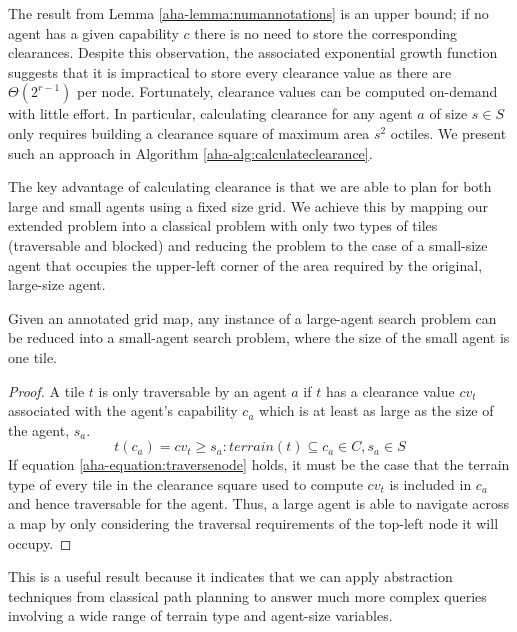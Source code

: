 The result from Lemma \ref{aha-lemma:numannotations} is an upper bound; if no agent has a given capability $c$ there is no need to store the corresponding clearances.
Despite this observation, the associated exponential growth function suggests that it is impractical to store every clearance value as there are $\Theta(2^{r-1})$ per node.
Fortunately, clearance values can be computed on-demand with little effort. 
In particular, calculating clearance for any agent $a$ of size $s \in S$ only requires building a clearance square of maximum area $s^2$ octiles. 
We present such an approach in Algorithm \ref{aha-alg:calculateclearance}. 

\par \indent
The key advantage of calculating clearance is that we are able to plan for both large and small agents using a fixed size grid. 
We achieve this by mapping our extended problem into a classical problem with only two types of tiles (traversable and blocked) and reducing the problem to the case of a small-size agent that occupies the upper-left corner of the area required by the original, large-size agent. 
\begin{theorem}
\label{aha-theorem:reducibility}
Given an annotated grid map, any instance of a large-agent search problem can be reduced into a small-agent search problem, where the size of the small agent is one tile.
\end{theorem}

\begin{proof}
A tile $t$ is only traversable by an agent $a$ if $t$ has a clearance value $cv_{t}$ associated with the agent's capability $c_{a}$ which is at least as large as the size of the agent, $s_{a}$. 
\begin{equation}
\label{aha-equation:traversenode}
t(c_{a}) = cv_{t} \geq s_{a} : terrain(t) \subseteq c_{a} \in C, s_{a} \in S
\end{equation}
If equation \ref{aha-equation:traversenode} holds, it must be the case that the terrain type of every tile in the clearance square used to compute $cv_{t}$ is included in $c_{a}$ and hence traversable for the agent. 
Thus, a large agent is able to navigate across a map by only considering the traversal requirements of the top-left node it will occupy.
\end{proof}
This is a useful result because it indicates that we can apply abstraction techniques from classical path planning to answer much more complex queries involving a wide range of terrain type and agent-size variables.
